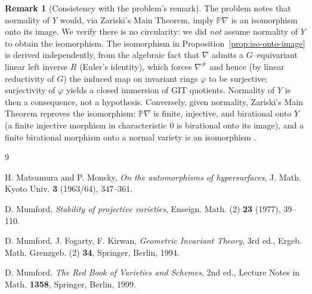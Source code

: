 \documentclass{amsart}
\theoremstyle{definition}
\newtheorem{remark}{Remark}
\newcommand{\PP}{\mathbb{P}}
\newcommand{\nab}{\nabla}
\begin{document}
\begin{remark}[Consistency with the problem's remark]
The problem notes that normality of $Y$ would, via Zariski's Main Theorem, imply $\PP\nab$ is
an isomorphism onto its image. We verify there is no circularity: we did \emph{not} assume
normality of $Y$ to obtain the isomorphism. The isomorphism in
Proposition~\ref{prop:iso-onto-image} is derived independently, from the algebraic fact that
$\nab$ admits a $G$--equivariant linear left inverse $R$ (Euler's identity), which forces
$\nab^{\#}$ and hence (by linear reductivity of $G$) the induced map on invariant rings
$\varphi$ to be surjective; surjectivity of $\varphi$ yields a closed immersion of GIT
quotients. Normality of $Y$ is then a consequence, not a hypothesis. Conversely, given
normality, Zariski's Main Theorem reproves the isomorphism: $\PP\nab$ is finite, injective,
and birational onto $Y$ (a finite injective morphism in characteristic $0$ is birational onto
its image), and a finite birational morphism onto a normal variety is an isomorphism
\cite[Ch.~III, \S 9]{Mumford-RB}.
\end{remark}

\begin{thebibliography}{9}

 H. Matsumura and P. Monsky,
\emph{On the automorphisms of hypersurfaces}, J. Math. Kyoto Univ. \textbf{3} (1963/64),
347--361.

 D. Mumford,
\emph{Stability of projective varieties}, Enseign. Math. (2) \textbf{23} (1977), 39--110.

 D. Mumford, J. Fogarty, F. Kirwan,
\emph{Geometric Invariant Theory}, 3rd ed., Ergeb. Math. Grenzgeb. (2) \textbf{34},
Springer, Berlin, 1994.

 D. Mumford,
\emph{The Red Book of Varieties and Schemes}, 2nd ed., Lecture Notes in Math. \textbf{1358},
Springer, Berlin, 1999.

\end{thebibliography}
\end{document}
